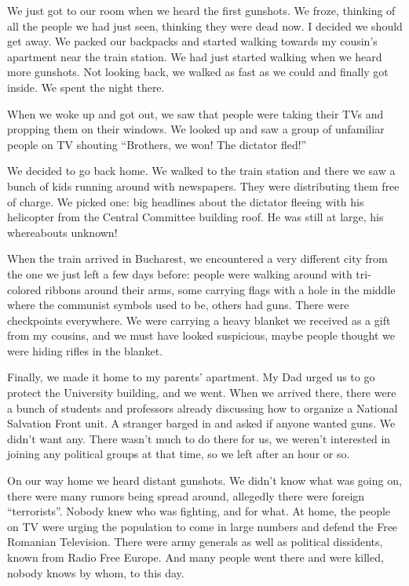 \documentclass[12pt]{book}
\begin{document}
We just got to our room when we heard the first gunshots. We froze,
thinking of all the people we had just seen, thinking they were dead
now. I decided we should get away. We packed our backpacks and started
walking towards my cousin's apartment near the train station. We had
just started walking when we heard more gunshots. Not looking back, we
walked as fast as we could and finally got inside. We spent the night
there.

When we woke up and got out, we saw that people were taking their TVs
and propping them on their windows. We looked up and saw a group of
unfamiliar people on TV shouting ``Brothers, we won! The dictator
fled!''

We decided to go back home. We walked to the train station and there we
saw a bunch of kids running around with newspapers. They were
distributing them free of charge. We picked one: big headlines about the
dictator fleeing with his helicopter from the Central Committee building
roof. He was still at large, his whereabouts unknown!

When the train arrived in Bucharest, we encountered a very different
city from the one we just left a few days before: people were walking
around with tri-colored ribbons around their arms, some carrying flags
with a hole in the middle where the communist symbols used to be, others
had guns. There were checkpoints everywhere. We were carrying a heavy
blanket we received as a gift from my cousins, and we must have looked
suspicious, maybe people thought we were hiding rifles in the blanket.

Finally, we made it home to my parents' apartment. My Dad urged us to go
protect the University building, and we went. When we arrived there,
there were a bunch of students and professors already discussing how to
organize a National Salvation Front unit. A stranger barged in and asked
if anyone wanted guns. We didn't want any. There wasn't much to do there
for us, we weren't interested in joining any political groups at that
time, so we left after an hour or so.

On our way home we heard distant gunshots. We didn't know what was going
on, there were many rumors being spread around, allegedly there were
foreign ``terrorists''. Nobody knew who was fighting, and for what. At
home, the people on TV were urging the population to come in large
numbers and defend the Free Romanian Television. There were army
generals as well as political dissidents, known from Radio Free Europe.
And many people went there and were killed, nobody knows by whom, to
this day.
\end{document}
